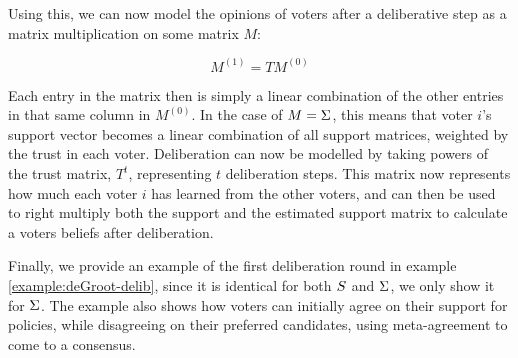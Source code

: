 Using this, we can now model the opinions of voters after a deliberative step
as a matrix multiplication on some matrix $M$:

\begin{equation} M^{(1)} = TM^{(0)} \label{eq:update_degroot} \end{equation}

Each entry in the matrix then is simply a linear combination of the other
entries in that same column in $M^{(0)}$. In the case of $M = \Sigma$,
this means that voter $i$'s support vector becomes a linear combination of all
support matrices, weighted by the trust in each voter. Deliberation can now be
modelled by taking powers of the trust matrix, $T^{t}$, representing $t$
deliberation steps. This matrix now represents how much each voter $i$ has
learned from the other voters, and can then be used to right multiply both the
support and the estimated support matrix to calculate a voters beliefs after
deliberation.

Finally, we provide an example of the first deliberation round in example
\ref{example:deGroot-delib}, since it is identical for both $S$ and
$\Sigma$, we only show it for $\Sigma$. The example also shows how
voters can initially agree on their support for policies, while disagreeing on
their preferred candidates, using meta-agreement to come to a consensus.

